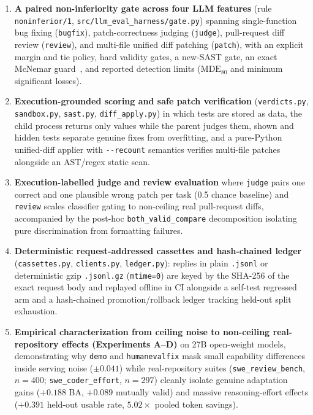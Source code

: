 \documentclass[conference]{IEEEtran}
\begin{document}
\begin{enumerate}
\item \textbf{A paired non-inferiority gate across four LLM features} (rule \texttt{noninferior/\allowbreak{}1}, \texttt{src/\allowbreak{}llm\_\allowbreak{}eval\_\allowbreak{}harness/\allowbreak{}gate.\allowbreak{}py}) spanning single-function bug fixing (\texttt{bugfix}), patch-correctness judging (\texttt{judge}), pull-request diff review (\texttt{review}), and multi-file unified diff patching (\texttt{patch}), with an explicit margin and tie policy, hard validity gates, a new-SAST gate, an exact McNemar guard~\cite{mcnemar1947}, and reported detection limits ($\mathrm{MDE}_{80}$ and minimum significant losses).
\item \textbf{Execution-grounded scoring and safe patch verification} (\texttt{verdicts.\allowbreak{}py}, \texttt{sandbox.\allowbreak{}py}, \texttt{sast.\allowbreak{}py}, \texttt{diff\_\allowbreak{}apply.\allowbreak{}py}) in which tests are stored as data, the child process returns only values while the parent judges them, shown and hidden tests separate genuine fixes from overfitting, and a pure-Python unified-diff applier with \texttt{-{}-{}recount} semantics verifies multi-file patches alongside an AST/regex static scan.
\item \textbf{Execution-labelled judge and review evaluation} where \texttt{judge} pairs one correct and one plausible wrong patch per task (0.5 chance baseline) and \texttt{review} scales classifier gating to non-ceiling real pull-request diffs, accompanied by the post-hoc \texttt{both\_\allowbreak{}valid\_\allowbreak{}compare} decomposition isolating pure discrimination from formatting failures.
\item \textbf{Deterministic request-addressed cassettes and hash-chained ledger} (\texttt{cassettes.\allowbreak{}py}, \texttt{clients.\allowbreak{}py}, \texttt{ledger.\allowbreak{}py}): replies in plain \texttt{.jsonl} or deterministic gzip \texttt{.jsonl.gz} (\texttt{mtime=0}) are keyed by the SHA-256 of the exact request body and replayed offline in CI alongside a self-test regressed arm and a hash-chained promotion/rollback ledger tracking held-out split exhaustion.
\item \textbf{Empirical characterization from ceiling noise to non-ceiling real-repository effects (Experiments A--D)} on 27B open-weight models, demonstrating why \texttt{demo} and \texttt{humanevalfix} mask small capability differences inside serving noise ($\pm 0.041$) while real-repository suites (\texttt{swe\_\allowbreak{}review\_\allowbreak{}bench}, $n=400$; \texttt{swe\_\allowbreak{}coder\_\allowbreak{}effort}, $n=297$) cleanly isolate genuine adaptation gains ($+0.188$ BA, $+0.089$ mutually valid) and massive reasoning-effort effects ($+0.391$ held-out usable rate, $5.02\times$ pooled token savings).

\end{enumerate}
\end{document}
